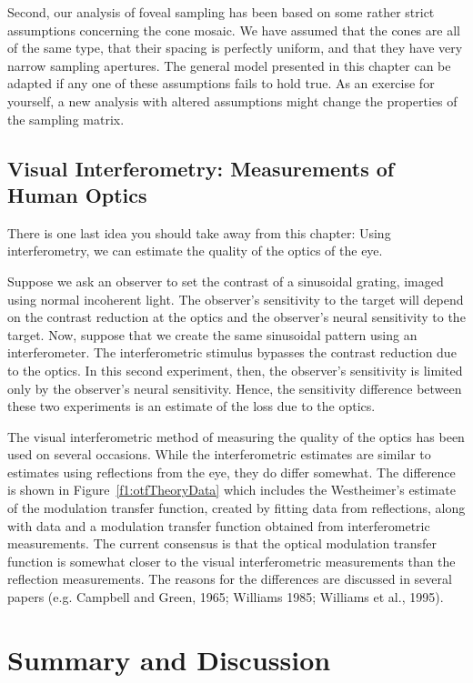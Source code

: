Second, our analysis of foveal sampling has been based on
some rather strict assumptions concerning the cone mosaic.
We have assumed that the cones are all of the
same type, that their spacing is perfectly uniform, and that
they have very narrow sampling apertures.
The general model presented in this
chapter can be adapted if any
one of these assumptions fails to hold true.
As an exercise for yourself,
a new analysis with altered assumptions might
change the properties of the sampling matrix.

\subsection*{Visual Interferometry: Measurements of Human Optics}
There is one last idea you should take away from this chapter:
Using interferometry, we can
estimate the quality of the optics of the eye.

Suppose we ask an observer to set the contrast of a
sinusoidal grating, imaged using normal incoherent light.
The observer's sensitivity to the target will depend on
the contrast reduction at the optics and the observer's
neural sensitivity to the target.
Now, suppose that we create the same sinusoidal
pattern using an interferometer.
The interferometric stimulus
bypasses the contrast reduction due to the optics.
In this second experiment, then, the observer's sensitivity
is limited only by the observer's neural sensitivity.
Hence, the sensitivity difference
between these two experiments
is an estimate of the loss due to the optics.

The visual interferometric method
of measuring the quality of the optics
has been used on several occasions.
While the interferometric estimates are similar
to estimates using reflections from the eye,
they do differ somewhat.
The difference is shown in Figure~\ref{f1:otfTheoryData}
which includes the Westheimer's estimate
of the modulation transfer function,
created by fitting data from reflections,
along with data and a modulation transfer function
obtained from interferometric measurements.
The current consensus is that
the optical modulation transfer function
is somewhat closer
to the visual interferometric measurements than
the reflection measurements.
The reasons for the differences are discussed in several papers
(e.g. Campbell and Green, 1965;  Williams 1985; Williams et al., 1995).

\section{Summary and Discussion}

